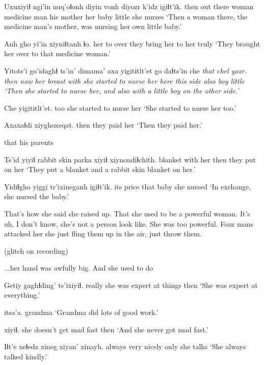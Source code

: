 \documentclass[12pt]{article}
\begin{document}
\gll Uxuxiyiɬ ngi'in    nuq'oɬonh diyin        vonh       diyozr k'idz  igiɬt'ik.
then     {out there} woman   {medicine man} {his mother} {her baby} little {she nurses}
\glt `Then a woman there, the medicine man's mother, was nursing her own little baby.' 
\glend

\gll Anh gho yi'in xiyniɬtanh            ɬo.
her  to over {they bring her to her} truly
\glt `They brought her over to that medicine woman.'
\glend

\gll Yitots'i go'idaghɬ ts'in' dimama'    axa  yigititlt'et    go              daɬts'in  che \em that \em chel yozr. 
then     now      {}     {her breast} with {she started to nurse her} here {this side} also {} boy little
\glt `Then she started to nurse her, and also with a little boy on the other side.'
\glend

\gll Che   yigititlt'et.
too {she started to nurse her}
\glt `She started to nurse her too.'
\glend

\gll Axaxaɬdi xiyghoxeqat.
then   {they paid her}
\glt `Then they paid her.'
\glend

that his parents

\gll Ts'id   yiyiɬ {rabbit skin parka} xiyiɬ xiynondiɬchith.         
blanket {with her}    {}               then  {they put on her}
\glt `They put a blanket and a rabbit skin blanket on her.'
\glend

\gll Yidiɬgho    yiggi tr'ixineganh igiɬt'ik.
{its price} that  baby         {she nursed}
\glt `In exchange, she nursed the baby.'
\glend

That's how she said she raised up. That she used to be a powerful woman.
It's uh, I don't know, she's not a person look like. She was too powerful. Four
mans attacked her she just fling them up in the air, just throw them.

(glitch on recording)

...her hand was awfully big.  And she used to do 

\gll Getiy  gaghɬding'               ts'ixiyiɬ.
really {she was expert at things} then
\glt `She was expert at everything.'
\glend

 itsa'a. 
{} grandma
\glt `Grandma did lots of good work.'
\glend

       xiyiɬ.
{she doesn't get mad fast} then
\glt `And she never got mad fast.'
\glend

\gll Iɬt'e  xeɬedz xineg  xiyan' xinayh.
always very   nicely only   {she talks}
\glt `She always talked kindly.'
\glend
\end{document}
